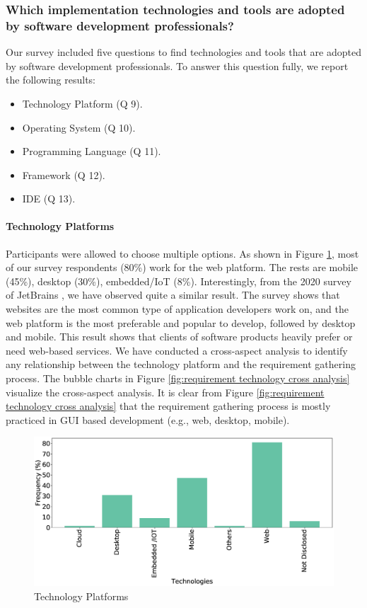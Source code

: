 \subsubsection{Which implementation technologies and tools are adopted by software development professionals?}
\label{tools}
Our survey included five questions to find technologies and tools that are adopted by software development professionals. To answer this question fully, we report the following results:

\begin{itemize}
\item Technology Platform (Q 9).
\item Operating System (Q 10).
\item Programming Language (Q 11).
\item Framework (Q 12).
\item IDE (Q 13).
\end{itemize}


\paragraph{Technology Platforms}
Participants were allowed to choose multiple options. As shown in Figure \ref{fig:platforms}, most of our survey respondents (80\%) work for the web platform. The rests are mobile (45\%), desktop (30\%), embedded/IoT (8\%). Interestingly, from the 2020 survey of JetBrains \cite{JetBrains2020}, we have observed quite a similar result. The survey shows that websites are the most common type of application developers work on, and the web platform is the most preferable and popular to develop, followed by desktop and mobile. This result shows that clients of software products heavily prefer or need web-based services. We have conducted a cross-aspect analysis to identify any relationship between the technology platform and the requirement gathering process. The bubble charts in Figure \ref{fig:requirement technology cross analysis} visualize the cross-aspect analysis. It is clear from Figure \ref{fig:requirement technology cross analysis} that the requirement gathering process is mostly practiced in GUI based development (e.g., web, desktop, mobile).

\begin{figure}[h]
\centering
  \includegraphics[scale=0.18]{Figures/Respondents_Technologies}
  \caption{Technology Platforms}
  \label{fig:platforms}
\end{figure}


